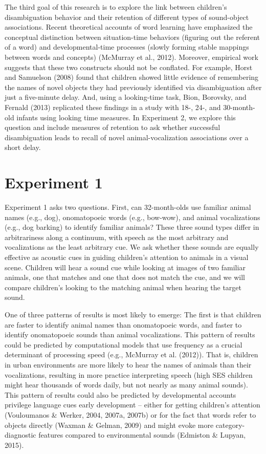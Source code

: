 \documentclass[english,floatsintext,man]{apa6}
\theoremstyle{definition}
\theoremstyle{definition}
\theoremstyle{definition}
\theoremstyle{remark}
\begin{document}
The third goal of this research is to explore the link between
children's disambiguation behavior and their retention of different
types of sound-object associations. Recent theoretical accounts of word
learning have emphasized the conceptual distinction between
situation-time behaviors (figuring out the referent of a word) and
developmental-time processes (slowly forming stable mappings between
words and concepts) (McMurray et al., 2012). Moreover, empirical work
suggests that these two constructs should not be conflated. For example,
Horst and Samuelson (2008) found that children showed little evidence of
remembering the names of novel objects they had previously identified
via disambiguation after just a five-minute delay. And, using a
looking-time task, Bion, Borovsky, and Fernald (2013) replicated these
findings in a study with 18-, 24-, and 30-month-old infants using
looking time measures. In Experiment 2, we explore this question and
include measures of retention to ask whether successful disambiguation
leads to recall of novel animal-vocalization associations over a short
delay.

\hypertarget{experiment-1}{%
\section{Experiment 1}\label{experiment-1}}

Experiment 1 asks two questions. First, can 32-month-olds use familiar
animal names (e.g., dog), onomatopoeic words (e.g., bow-wow), and animal
vocalizations (e.g., dog barking) to identify familiar animals? These
three sound types differ in arbitrariness along a continuum, with speech
as the most arbitrary and vocalizations as the least arbitrary cue. We
ask whether these sounds are equally effective as acoustic cues in
guiding children's attention to animals in a visual scene. Children will
hear a sound cue while looking at images of two familiar animals, one
that matches and one that does not match the cue, and we will compare
children's looking to the matching animal when hearing the target sound.

One of three patterns of results is most likely to emerge: The first is
that children are faster to identify animal names than onomatopoeic
words, and faster to identify onomatopoeic sounds than animal
vocalizations. This pattern of results could be predicted by
computational models that use frequency as a crucial determinant of
processing speed (e.g., McMurray et al. (2012)). That is, children in
urban environments are more likely to hear the names of animals than
their vocalizations, resulting in more practice interpreting speech
(high SES children might hear thousands of words daily, but not nearly
as many animal sounds). This pattern of results could also be predicted
by developmental accounts privilege language cues early development --
either for getting children's attention (Vouloumanos \& Werker, 2004,
2007a, 2007b) or for the fact that words refer to objects directly
(Waxman \& Gelman, 2009) and might evoke more category-diagnostic
features compared to environmental sounds (Edmiston \& Lupyan, 2015).
\end{document}
